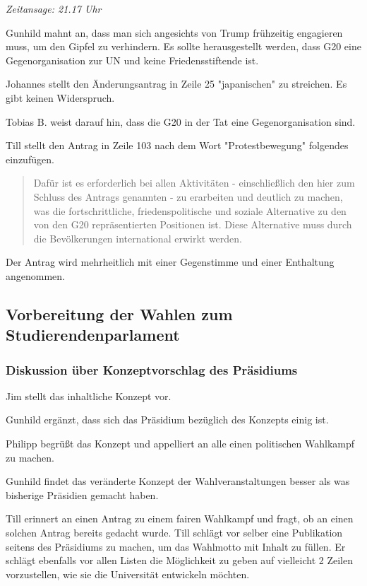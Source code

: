 \documentclass[ngerman,headheight=70pt]{scrartcl}
\begin{document}
    \textit{Zeitansage: 21.17 Uhr}

    Gunhild mahnt an, dass man sich angesichts von Trump frühzeitig engagieren
    muss, um den Gipfel zu verhindern. Es sollte herausgestellt werden, dass
    G20 eine Gegenorganisation zur UN und keine Friedensstiftende ist.

    Johannes stellt den Änderungsantrag in Zeile 25 "japanischen" zu streichen.
    Es gibt keinen Widerspruch.

    Tobias B. weist darauf hin, dass die G20 in der Tat eine Gegenorganisation
    sind.

    Till stellt den Antrag in Zeile 103 nach dem Wort "Protestbewegung" folgendes
    einzufügen.

    \blockquote{
        Dafür ist es erforderlich bei allen Aktivitäten - einschließlich den hier
        zum Schluss des Antrags genannten - zu erarbeiten und deutlich zu machen,
        was die fortschrittliche, friedenspolitische und soziale Alternative zu
        den von den G20 repräsentierten Positionen ist. Diese Alternative muss
        durch die Bevölkerungen international erwirkt werden.
    }

    Der Antrag wird mehrheitlich mit einer Gegenstimme und einer Enthaltung angenommen.

    \subsection{Vorbereitung der Wahlen zum Studierendenparlament}

    \subsubsection{Diskussion über Konzeptvorschlag des Präsidiums}

    Jim stellt das inhaltliche Konzept vor.

    Gunhild ergänzt, dass sich das Präsidium bezüglich des Konzepts einig ist.

    Philipp begrüßt das Konzept und appelliert an alle einen politischen Wahlkampf
    zu machen.

    Gunhild findet das veränderte Konzept der Wahlveranstaltungen besser als was
    bisherige Präsidien gemacht haben.

    Till erinnert an einen Antrag zu einem fairen Wahlkampf und fragt, ob an einen
    solchen Antrag bereits gedacht wurde. Till schlägt vor selber eine Publikation
    seitens des Präsidiums zu machen, um das Wahlmotto mit Inhalt zu füllen. Er
    schlägt ebenfalls vor allen Listen die Möglichkeit zu geben auf vielleicht 2
    Zeilen vorzustellen, wie sie die Universität entwickeln möchten.
\end{document}
